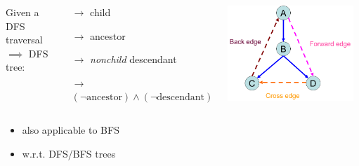 \begin{frame}{}
  \begin{definition}
    \begin{columns}
	Given a DFS traversal $\implies$ DFS tree:
	\begin{description}
	  \item[Tree edge:] $\to$ child \\[10pt]
	  \item[Back edge:] $\to$ ancestor
	  \item[Forward edge:] $\to$ \emph{nonchild} descendant
	  \item[Cross edge:] $\to$ $(\lnot \text{ancestor}) \land (\lnot \text{descendant})$
	\end{description}
	\includegraphics[width = 0.95\textwidth]{figs/dfs-digraph.png}
    \end{columns}
  \end{definition}

  \pause
  \vspace{0.50cm}
  \begin{itemize}
    \centering
    \item also applicable to BFS
    \item w.r.t. DFS/BFS trees
  \end{itemize}
\end{frame}

